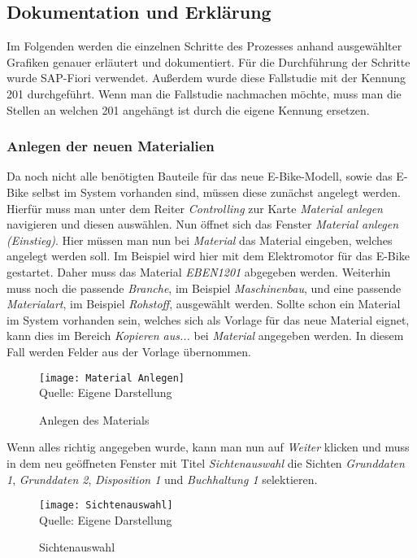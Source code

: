 \subsection{Dokumentation und Erklärung}
Im Folgenden werden die einzelnen Schritte des Prozesses anhand ausgewählter Grafiken genauer erläutert und dokumentiert. Für die Durchführung der Schritte wurde SAP-Fiori verwendet. Außerdem wurde diese Fallstudie
 mit der Kennung 201 durchgeführt. Wenn man die Fallstudie nachmachen möchte, muss man die Stellen an welchen 201 angehängt ist durch die eigene Kennung ersetzen.
\subsubsection{Anlegen der neuen Materialien}
Da noch nicht alle benötigten Bauteile für das neue E-Bike-Modell, sowie das E-Bike selbst im System vorhanden sind, müssen diese zunächst angelegt werden.
 Hierfür muss man unter dem Reiter \textit{Controlling} zur Karte \textit{Material anlegen} navigieren und diesen auswählen. Nun öffnet sich das Fenster 
 \textit{Material anlegen (Einstieg)}. Hier müssen man nun bei \textit{Material} das Material eingeben, welches angelegt werden soll. Im Beispiel wird hier mit dem Elektromotor für das E-Bike gestartet. Daher muss
 das Material \textit{EBEN1201} abgegeben werden. Weiterhin muss noch die passende
 \textit{Branche}, im Beispiel \textit{Maschinenbau}, und eine passende \textit{Materialart}, im Beispiel \textit{Rohstoff}, ausgewählt werden. Sollte schon ein Material im System vorhanden sein, 
 welches sich als Vorlage für das neue Material eignet, kann dies im Bereich \textit{Kopieren aus...} bei \textit{Material} angegeben werden. In diesem Fall werden Felder aus der Vorlage übernommen.
\begin{figure}[H]
    \caption{Anlegen des Materials}\label{fig:material}
    \texttt{[image: Material Anlegen]}
    \\
    Quelle: Eigene Darstellung
\end{figure}
Wenn alles richtig angegeben wurde, kann man nun auf \textit{Weiter} klicken und muss in dem neu geöffneten Fenster mit Titel \textit{Sichtenauswahl} die Sichten
 \textit{Grunddaten 1}, \textit{Grunddaten 2}, \textit{Disposition 1} und \textit{Buchhaltung 1} selektieren.
\begin{figure}[H]
    \caption{Sichtenauswahl}\label{fig:sichtenauswahl}
    \texttt{[image: Sichtenauswahl]}
    \\
    Quelle: Eigene Darstellung
\end{figure}
